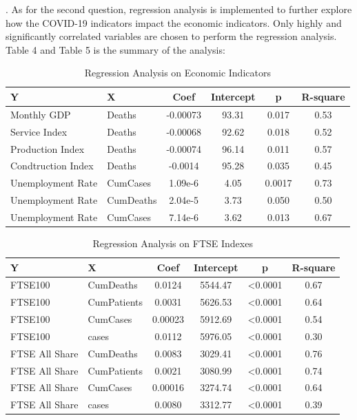 \documentclass[12pt, a4paper]{report}
\begin{document}
. As for the second question, regression analysis is implemented to further explore how the COVID-19 indicators impact 
the economic indicators. Only highly and significantly correlated variables are chosen to perform the regression analysis.
Table 4 and Table 5 is the summary of the analysis:\par
\noindent

\begin{table}[H]
    \begin{center}
    \caption{Regression Analysis on Economic Indicators}
    \begin{tabular}{llcccc}
        \toprule
        Y&X&Coef&Intercept&p&R-square\\
        \midrule
        Monthly GDP&Deaths&-0.00073&93.31&0.017&0.53\\
        Service Index&Deaths&-0.00068&92.62&0.018&0.52\\
        Production Index&Deaths&-0.00074&96.14&0.011&0.57\\
        Condtruction Index&Deaths&-0.0014&95.28&0.035&0.45\\
        Unemployment Rate&CumCases&1.09e-6&4.05&0.0017&0.73\\
        Unemployment Rate&CumDeaths&2.04e-5&3.73&0.050&0.50\\
        Unemployment Rate&CumCases&7.14e-6&3.62&0.013&0.67\\
        \bottomrule
    \end{tabular}
    \end{center}
\end{table}

\begin{table}[H]
    \begin{center}
    \caption{Regression Analysis on FTSE Indexes}
    \begin{tabular}{llcccc}
        \toprule
        Y&X&Coef&Intercept&p&R-square\\
        \midrule
        FTSE100&CumDeaths&0.0124&5544.47&<0.0001&0.67\\
        FTSE100&CumPatients&0.0031&5626.53&<0.0001&0.64\\
        FTSE100&CumCases&0.00023&5912.69&<0.0001&0.54\\
        FTSE100&cases&0.0112&5976.05&<0.0001&0.30\\
        FTSE All Share&CumDeaths&0.0083&3029.41&<0.0001&0.76\\
        FTSE All Share&CumPatients&0.0021&3080.99&<0.0001&0.74\\
        FTSE All Share&CumCases&0.00016&3274.74&<0.0001&0.64\\
        FTSE All Share&cases&0.0080&3312.77&<0.0001&0.39\\
        \bottomrule
    \end{tabular}
    \end{center}
\end{table}
\end{document}
